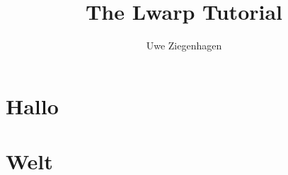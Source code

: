 \documentclass{book}
\title{The Lwarp Tutorial}
\author{Uwe Ziegenhagen}
\begin{document}
\maketitle 
 
\tableofcontents
 
\section{Hallo}
 
\blindtext[20]
 
\section{Welt}
 
\blindtext[20]
 
 
\end{document}
